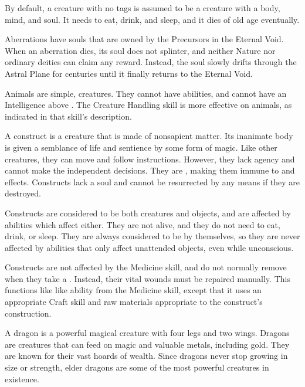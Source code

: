   By default, a creature with no tags is assumed to be a  creature with a body, mind, and soul.
  It needs to eat, drink, and sleep, and it dies of old age eventually.

  Aberrations have souls that are owned by the Precursors in the Eternal Void.
  When an aberration dies, its soul does not splinter, and neither Nature nor ordinary deities can claim any reward.
  Instead, the soul slowly drifts through the Astral Plane for centuries until it finally returns to the Eternal Void.

  Animals are simple,  creatures.
  They cannot have \magical abilities, and cannot have an Intelligence above .
  The Creature Handling skill is more effective on animals, as indicated in that skill's description.

   A construct is a creature that is made of nonsapient matter.
  Its inanimate body is given a semblance of life and sentience by some form of magic.
  Like other creatures, they can move and follow instructions.
  However, they lack agency and cannot make the independent decisions.
  They are , making them immune to  and  effects.
  Constructs lack a soul and cannot be resurrected by any means if they are destroyed.

  Constructs are considered to be both creatures and objects, and are affected by abilities which affect either.
  They are not alive, and they do not need to eat, drink, or sleep.
  They are always considered to be  by themselves, so they are never affected by abilities that only affect unattended objects, even while unconscious.

  Constructs are not affected by the Medicine skill, and do not normally remove  when they take a .
  Instead, their vital wounds must be repaired manually.
  This functions like like  ability from the Medicine skill, except that it uses an appropriate Craft skill and raw materials appropriate to the construct's construction.

   A dragon is a powerful magical creature with four legs and two wings.
  Dragons are  creatures that can feed on magic and valuable metals, including gold. 
  They are known for their vast hoards of wealth.
  Since dragons never stop growing in size or strength, elder dragons are some of the most powerful creatures in existence.

